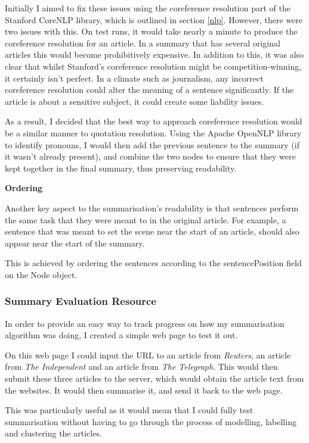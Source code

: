 \documentclass[12pt]{article}
\begin{document}
Initially I aimed to fix these issues using the coreference resolution part of the Stanford CoreNLP library, which is outlined in section \ref{nlp}. However, there were two issues with this. On test runs, it would take nearly a minute to produce the coreference resolution for an article. In a summary that has several original articles this would become prohibitively expensive. In addition to this, it was also clear that whilst Stanford's coreference resolution might be competition-winning, it certainly isn't perfect. In a climate such as journalism, any incorrect coreference resolution could alter the meaning of a sentence significantly. If the article is about a sensitive subject, it could create some liability issues.

As a result, I decided that the best way to approach coreference resolution would be a similar manner to quotation resolution. Using the Apache OpenNLP library to identify pronouns, I would then add the previous sentence to the summary (if it wasn't already present), and combine the two nodes to ensure that they were kept together in the final summary, thus preserving readability.

\textbf{Ordering}

Another key aspect to the summarisation's readability is that sentences perform the same task that they were meant to in the original article. For example, a sentence that was meant to set the scene near the start of an article, should also appear near the start of the summary. 

This is achieved by ordering the sentences according to the sentencePosition field on the Node object. 

\subsubsection{Summary Evaluation Resource}

In order to provide an easy way to track progress on how my summarisation algorithm was doing, I created a simple web page to test it out. 

On this web page I could input the URL to an article from \emph{Reuters}, an article from \emph{The Independent} and an article from \emph{The Telegraph}. This would then submit these three articles to the server, which would obtain the article text from the websites. It would then summarise it, and send it back to the web page.

This was particularly useful as it would mean that I could fully test summarisation without having to go through the process of modelling, labelling and clustering the articles.
\end{document}
